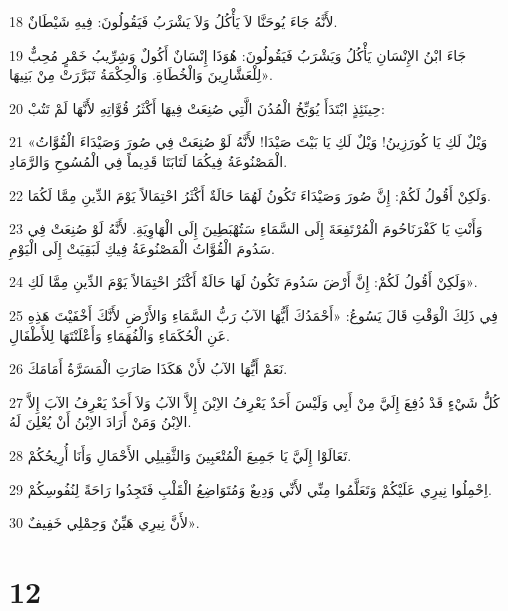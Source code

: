 \par 18 لأَنَّهُ جَاءَ يُوحَنَّا لاَ يَأْكُلُ وَلاَ يَشْرَبُ فَيَقُولُونَ: فِيهِ شَيْطَانٌ.
\par 19 جَاءَ ابْنُ الإِنْسَانِ يَأْكُلُ وَيَشْرَبُ فَيَقُولُونَ: هُوَذَا إِنْسَانٌ أَكُولٌ وَشِرِّيبُ خَمْرٍ مُحِبٌّ لِلْعَشَّارِينَ وَالْخُطَاةِ. وَالْحِكْمَةُ تَبَرَّرَتْ مِنْ بَنِيهَا».
\par 20 حِينَئِذٍ ابْتَدَأَ يُوَبِّخُ الْمُدُنَ الَّتِي صُنِعَتْ فِيهَا أَكْثَرُ قُوَّاتِهِ لأَنَّهَا لَمْ تَتُبْ:
\par 21 «وَيْلٌ لَكِ يَا كُورَزِينُ! وَيْلٌ لَكِ يَا بَيْتَ صَيْدَا! لأَنَّهُ لَوْ صُنِعَتْ فِي صُورَ وَصَيْدَاءَ الْقُوَّاتُ الْمَصْنُوعَةُ فِيكُمَا لَتَابَتَا قَدِيماً فِي الْمُسُوحِ وَالرَّمَادِ.
\par 22 وَلَكِنْ أَقُولُ لَكُمْ: إِنَّ صُورَ وَصَيْدَاءَ تَكُونُ لَهُمَا حَالَةٌ أَكْثَرُ احْتِمَالاً يَوْمَ الدِّينِ مِمَّا لَكُمَا.
\par 23 وَأَنْتِ يَا كَفْرَنَاحُومَ الْمُرْتَفِعَةَ إِلَى السَّمَاءِ سَتُهْبَطِينَ إِلَى الْهَاوِيَةِ. لأَنَّهُ لَوْ صُنِعَتْ فِي سَدُومَ الْقُوَّاتُ الْمَصْنُوعَةُ فِيكِ لَبَقِيَتْ إِلَى الْيَوْمِ.
\par 24 وَلَكِنْ أَقُولُ لَكُمْ: إِنَّ أَرْضَ سَدُومَ تَكُونُ لَهَا حَالَةٌ أَكْثَرُ احْتِمَالاً يَوْمَ الدِّينِ مِمَّا لَكِ».
\par 25 فِي ذَلِكَ الْوَقْتِ قَالَ يَسُوعُ: «أَحْمَدُكَ أَيُّهَا الآبُ رَبُّ السَّمَاءِ وَالأَرْضِ لأَنَّكَ أَخْفَيْتَ هَذِهِ عَنِ الْحُكَمَاءِ وَالْفُهَمَاءِ وَأَعْلَنْتَهَا لِلأَطْفَالِ.
\par 26 نَعَمْ أَيُّهَا الآبُ لأَنْ هَكَذَا صَارَتِ الْمَسَرَّةُ أَمَامَكَ.
\par 27 كُلُّ شَيْءٍ قَدْ دُفِعَ إِلَيَّ مِنْ أَبِي وَلَيْسَ أَحَدٌ يَعْرِفُ الاِبْنَ إِلاَّ الآبُ وَلاَ أَحَدٌ يَعْرِفُ الآبَ إِلاَّ الاِبْنُ وَمَنْ أَرَادَ الاِبْنُ أَنْ يُعْلِنَ لَهُ.
\par 28 تَعَالَوْا إِلَيَّ يَا جَمِيعَ الْمُتْعَبِينَ وَالثَّقِيلِي الأَحْمَالِ وَأَنَا أُرِيحُكُمْ.
\par 29 اِحْمِلُوا نِيرِي عَلَيْكُمْ وَتَعَلَّمُوا مِنِّي لأَنِّي وَدِيعٌ وَمُتَوَاضِعُ الْقَلْبِ فَتَجِدُوا رَاحَةً لِنُفُوسِكُمْ.
\par 30 لأَنَّ نِيرِي هَيِّنٌ وَحِمْلِي خَفِيفٌ».

\chapter{12}

